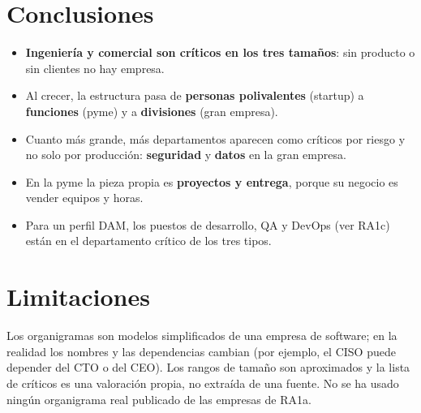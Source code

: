 \section{Conclusiones}
\begin{itemize}
\item \textbf{Ingenier\'ia y comercial son cr\'iticos en los tres tama\~nos}: sin producto o sin clientes no hay empresa.
\item Al crecer, la estructura pasa de \textbf{personas polivalentes} (startup) a \textbf{funciones} (pyme) y a \textbf{divisiones} (gran empresa).
\item Cuanto m\'as grande, m\'as departamentos aparecen como cr\'iticos por riesgo y no solo por producci\'on: \textbf{seguridad} y \textbf{datos} en la gran empresa.
\item En la pyme la pieza propia es \textbf{proyectos y entrega}, porque su negocio es vender equipos y horas.
\item Para un perfil DAM, los puestos de desarrollo, QA y DevOps (ver RA1c) est\'an en el departamento cr\'itico de los tres tipos.
\end{itemize}

\section{Limitaciones}
Los organigramas son modelos simplificados de una empresa de software; en la realidad los nombres y las dependencias cambian (por ejemplo, el CISO puede depender del CTO o del CEO). Los rangos de tama\~no son aproximados y la lista de cr\'iticos es una valoraci\'on propia, no extra\'ida de una fuente. No se ha usado ning\'un organigrama real publicado de las empresas de RA1a.


